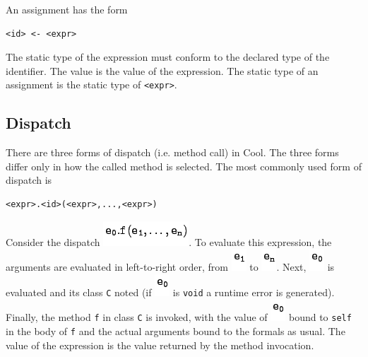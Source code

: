 \documentclass[]{article}
\begin{document}
An assignment has the form

\begin{verbatim}
<id> <- <expr>
\end{verbatim}

The static type of the expression must conform to the declared type of
the identifier. The value is the value of the expression. The static
type of an assignment is the static type of
\texttt{\textless{}expr\textgreater{}}.

\subsection{Dispatch}

There are three forms of dispatch (i.e. method call) in Cool. The three
forms differ only in how the called method is selected. The most
commonly used form of dispatch is

\begin{verbatim}
<expr>.<id>(<expr>,...,<expr>)
\end{verbatim}

Consider the dispatch \includegraphics{img16.png}. To evaluate this
expression, the arguments are evaluated in left-to-right order, from
\includegraphics{img17.png} to \includegraphics{img18.png}. Next,
\includegraphics{img19.png} is evaluated and its class \texttt{C} noted
(if \includegraphics{img19.png} is \texttt{void} a runtime error is
generated). Finally, the method \texttt{f} in class \texttt{C} is
invoked, with the value of \includegraphics{img19.png} bound to
\texttt{self} in the body of \texttt{f} and the actual arguments bound
to the formals as usual. The value of the expression is the value
returned by the method invocation.
\end{document}
